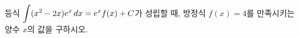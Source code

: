 \hspace*{2mm}\begin{minipage}[t]{\dimexpr\linewidth-2mm\relax}\vspace{0pt}
등식 $\displaystyle\int(x^2-2x)e^x\mkern3mu dx=e^xf(x)+C$가 성립할 때, 방정식 $f(x)=4$를 만족시키는 양수 $x$의 값을 구하시오. \end{minipage}
